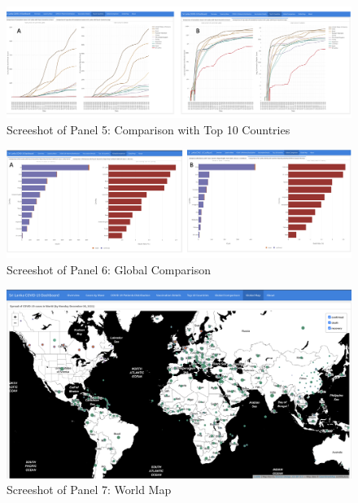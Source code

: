 \documentclass[
]{article}
\begin{document}
\begin{figure}

{\centering \includegraphics[width=0.8\linewidth]{Images/image5} 

}

\caption{Screeshot of Panel 5: Comparison with Top 10 Countries}\label{fig:unnamed-chunk-9}
\end{figure}

\begin{figure}

{\centering \includegraphics[width=0.8\linewidth]{Images/image6} 

}

\caption{Screeshot of Panel 6: Global Comparison}\label{fig:unnamed-chunk-10}
\end{figure}

\begin{figure}

{\centering \includegraphics[width=0.8\linewidth]{Images/image7} 

}

\caption{Screeshot of Panel 7: World Map}\label{fig:unnamed-chunk-11}
\end{figure}
\end{document}
